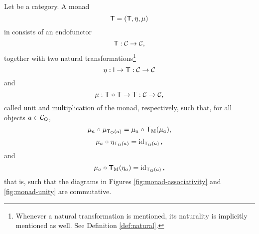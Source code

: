 
\begin{definition}
  \label{def:monad}


  Let  be a category. A monad
  \begin{equation}
    \label{eq:monad}
    \mathsf{T} = (\mathsf{T}, \eta, \mu)
  \end{equation}
  in  consists of an endofunctor
  \begin{equation}
    \label{eq:monad-}
    \mathsf{T}: \mathcal{C} \to \mathcal{C}
    \text{,}
  \end{equation}
  together with two natural transformations\footnote{Whenever a
    natural transformation is mentioned, its naturality is implicitly
    mentioned as well. See Definition \ref{def:natural}.}
  \begin{equation}
    \label{eq:monad-unit}
    \eta: \mathsf{I} \to \mathsf{T}: \mathcal{C} \to \mathcal{C}
  \end{equation}
  and
  \begin{equation}
    \label{eq:monad-multiplication}
    \mu: \mathsf{T \mathrel{\circ} T} \to \mathsf{T}: \mathcal{C} \to \mathcal{C}
    \text{,}
  \end{equation}
  called unit and multiplication of the monad, respectively, such
  that, for all objects $a \in \mathcal{C}_{\operatorname{O}}$,
  \begin{equation}
    \label{eq:monad-associativity}
    \mu_{a} \mathrel{\circ} \mu_{\mathsf{T}_{\operatorname{O}}(a)} = \mu_{a} \mathrel{\circ} \mathsf{T}_{\operatorname{M}}(\mu_{a})
    \text{,}
  \end{equation}
  \begin{equation}
    \label{eq:monad-unity-left}
    \mu_{a} \mathrel{\circ} \eta_{\mathsf{T}_{\operatorname{O}}(a)} = \operatorname{id}_{\mathsf{T}_{\operatorname{O}}(a)}
    \text{,}
  \end{equation}
  and
  \begin{equation}
    \label{eq:monad-unity-right}
    \mu_{a} \mathrel{\circ} \mathsf{T}_{\operatorname{M}}(\eta_{a}) = \operatorname{id}_{\mathsf{T}_{\operatorname{O}}(a)}
    \text{,}
  \end{equation}
  that is, such that the diagrams in Figures
  \ref{fig:monad-associativity} and \ref{fig:monad-unity} are
  commutative.
  \begin{figure}[htb]
    \begin{center}
\end{center}
\end{figure}
\end{definition}
